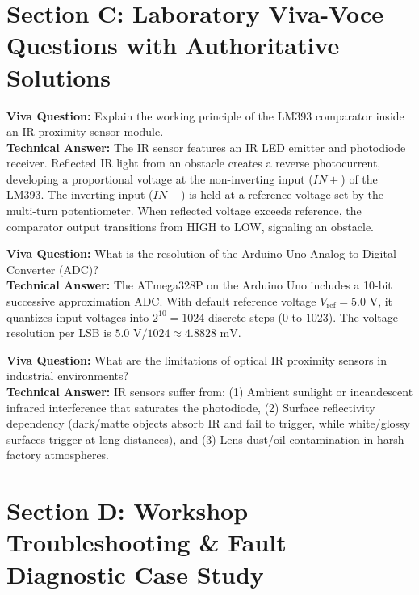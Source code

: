 \section{Section C: Laboratory Viva-Voce Questions with Authoritative Solutions}

\noindent\textbf{Viva Question:} Explain the working principle of the LM393 comparator inside an IR proximity sensor module.\\
\textbf{Technical Answer:} The IR sensor features an IR LED emitter and photodiode receiver. Reflected IR light from an obstacle creates a reverse photocurrent, developing a proportional voltage at the non-inverting input ($IN+$) of the LM393. The inverting input ($IN-$) is held at a reference voltage set by the multi-turn potentiometer. When reflected voltage exceeds reference, the comparator output transitions from HIGH to LOW, signaling an obstacle.
\vspace{3mm}

\noindent\textbf{Viva Question:} What is the resolution of the Arduino Uno Analog-to-Digital Converter (ADC)?\\
\textbf{Technical Answer:} The ATmega328P on the Arduino Uno includes a 10-bit successive approximation ADC. With default reference voltage $V_{\mathrm{ref}} = 5.0\text{ V}$, it quantizes input voltages into $2^{10} = 1024$ discrete steps ($0$ to $1023$). The voltage resolution per LSB is $5.0\text{ V} / 1024 \approx 4.8828\text{ mV}$.
\vspace{3mm}

\noindent\textbf{Viva Question:} What are the limitations of optical IR proximity sensors in industrial environments?\\
\textbf{Technical Answer:} IR sensors suffer from: (1) Ambient sunlight or incandescent infrared interference that saturates the photodiode, (2) Surface reflectivity dependency (dark/matte objects absorb IR and fail to trigger, while white/glossy surfaces trigger at long distances), and (3) Lens dust/oil contamination in harsh factory atmospheres.
\vspace{3mm}


\section{Section D: Workshop Troubleshooting \& Fault Diagnostic Case Study}

